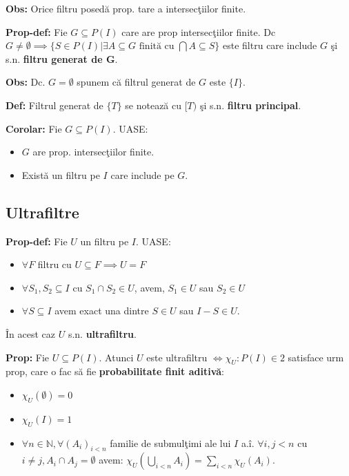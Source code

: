 \documentclass{article}
\begin{document}
\textbf{Obs:} Orice filtru posed\u a prop. tare a intersec\c tiilor finite.

\textbf{Prop-def:} Fie $G\subseteq P(I)$ care are prop intersec\c tiilor finite. Dc $G\neq \emptyset\implies \{S\in P(I)|\exists A\subseteq G \text{ finit\u a cu } \bigcap A\subseteq S \}$ este filtru care include $G$ \c si s.n. \textbf{filtru generat de G}.

\textbf{Obs:} Dc. $G=\emptyset$ spunem c\u a filtrul generat de $G$ este $\{I\}$.

\textbf{Def:} Filtrul generat de $\{T\}$ se noteaz\u a cu $[T)$ \c si s.n. \textbf{filtru principal}.

\textbf{Corolar:} Fie $G\subseteq P(I)$. UASE:
\begin{itemize}
    \item $G$ are prop. intersec\c tiilor finite.
    \item Exist\u a un filtru pe $I$ care include pe $G$.
\end{itemize}

\subsection{Ultrafiltre}

\textbf{Prop-def:} Fie $U$ un filtru pe $I$. UASE:
\begin{itemize}
    \item $\forall F$ filtru cu $U\subseteq F \implies U=F$
    \item $\forall S_1,S_2\subseteq I$ cu $S_1\cap S_2\in U$, avem, $S_1\in U$ sau $S_2\in U$
    \item $\forall S\subseteq I$ avem exact una dintre $S\in U$ sau $I-S\in U$.
\end{itemize}
\^ In acest caz $U$ s.n. \textbf{ultrafiltru}.

\textbf{Prop:} Fie $U\subseteq P(I)$. Atunci $U$ este ultrafiltru $\iff \chi_U:P(I)\in 2$ satisface urm prop, care o fac s\u a fie \textbf{probabilitate finit aditiv\u a}:
\begin{itemize}
    \item $\chi_U(\emptyset)=0$
    \item $\chi_U(I)=1$
    \item $\forall n\in \mathbb N, \forall (A_i)_{i<n}$ familie de submul\c timi ale lui $I$ a.\^ i. $\forall i,j<n$ cu $i\neq j, A_i\cap A_j=\emptyset$  avem: $\chi_U(\bigcup_{i<n}A_i)=\sum_{i<n} \chi_U(A_i)$.
\end{itemize}
\end{document}

